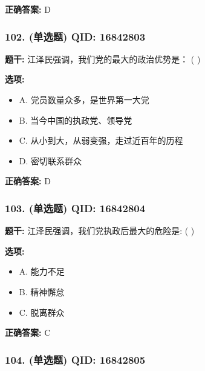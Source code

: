 \documentclass[12pt,UTF8]{ctexart}
\begin{document}
\textbf{正确答案:}
D

\vspace{0.3em}\hrulefill\vspace{0.7em}

\subsubsection*{102. (单选题) \small QID: 16842803}

\textbf{题干:}
江泽民强调，我们党的最大的政治优势是： ( )

\textbf{选项:}
\begin{itemize}[leftmargin=*]

  \item A. 党员数量众多，是世界第一大党

  \item B. 当今中国的执政党、领导党

  \item C. 从小到大，从弱变强，走过近百年的历程

  \item D. 密切联系群众

\end{itemize}

\textbf{正确答案:}
D

\vspace{0.3em}\hrulefill\vspace{0.7em}

\subsubsection*{103. (单选题) \small QID: 16842804}

\textbf{题干:}
江泽民强调，我们党执政后最大的危险是: ( )

\textbf{选项:}
\begin{itemize}[leftmargin=*]

  \item A. 能力不足

  \item B. 精神懈怠

  \item C. 脱离群众

\end{itemize}

\textbf{正确答案:}
C

\vspace{0.3em}\hrulefill\vspace{0.7em}

\subsubsection*{104. (单选题) \small QID: 16842805}
\end{document}
